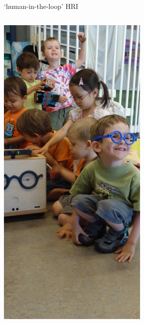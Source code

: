 \documentclass[xcolor=table]{beamer}
\begin{document}
\begin{frame}{`human-in-the-loop' HRI}
    \begin{center}
    \begin{columns}
        

        \begin{column}{0.3\linewidth}
            \includegraphics[height=0.75\paperheight]{croquignole-narrow.jpg}
        \end{column}


        \begin{column}{0.7\linewidth}
            \centering


\end{column}
\end{columns}
\end{center}
\end{frame}
\end{document}
